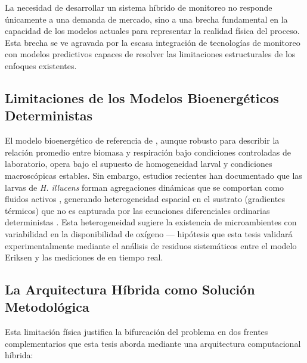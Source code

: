 La necesidad de desarrollar un sistema híbrido de monitoreo no responde únicamente a una demanda de mercado, sino a una brecha fundamental en la capacidad de los modelos actuales para representar la realidad física del proceso. Esta brecha se ve agravada por la escasa integración de tecnologías de monitoreo con modelos predictivos capaces de resolver las limitaciones estructurales de los enfoques existentes.

\subsection{Limitaciones de los Modelos Bioenergéticos Deterministas}
El modelo bioenergético de referencia de \textcite{eriksenDynamicModellingFeed2022}, aunque robusto para describir la relación promedio entre biomasa y respiración bajo condiciones controladas de laboratorio, opera bajo el supuesto de homogeneidad larval y condiciones macroscópicas estables. Sin embargo, estudios recientes han documentado que las larvas de \textit{H. illucens} forman agregaciones dinámicas que se comportan como fluidos activos \parencite{koAirFluidizedAggregatesBlack2021}, generando heterogeneidad espacial en el sustrato (gradientes térmicos) que no es capturada por las ecuaciones diferenciales ordinarias deterministas \parencite{tomberlinBugBookBlackSoldier2025}. Esta heterogeneidad sugiere la existencia de microambientes con variabilidad en la disponibilidad de oxígeno --- hipótesis que esta tesis validará experimentalmente mediante el análisis de residuos sistemáticos entre el modelo Eriksen y las mediciones de  en tiempo real.

\subsection{La Arquitectura Híbrida como Solución Metodológica}
Esta limitación física justifica la bifurcación del problema en dos frentes complementarios que esta tesis aborda mediante una arquitectura computacional híbrida:

